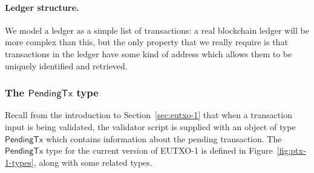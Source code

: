 \documentclass[a4paper]{article}
\newcommand{\s}{\textsf}  %
\newcommand{\ptx}{\ensuremath{\s{PendingTx}}}
\begin{document}
\paragraph{Ledger structure.} We model a ledger as a simple
list of transactions: a real blockchain ledger will be more complex
than this, but the only property that we really require is that
transactions in the ledger have some kind of address which allows them
to be uniquely identified and retrieved.

\subsubsection{The $\ptx$ type}
\label{sec:pendingtx}
Recall from the introduction to Section~\ref{sec:eutxo-1} that when a
transaction input is being validated, the validator script is supplied
with an object of type $\ptx$ which contains information about the
pending transaction.  The $\ptx$ type for the current version of
EUTXO-1 is defined in Figure~\ref{fig:ptx-1-types}, along with some
related types.
\end{document}

